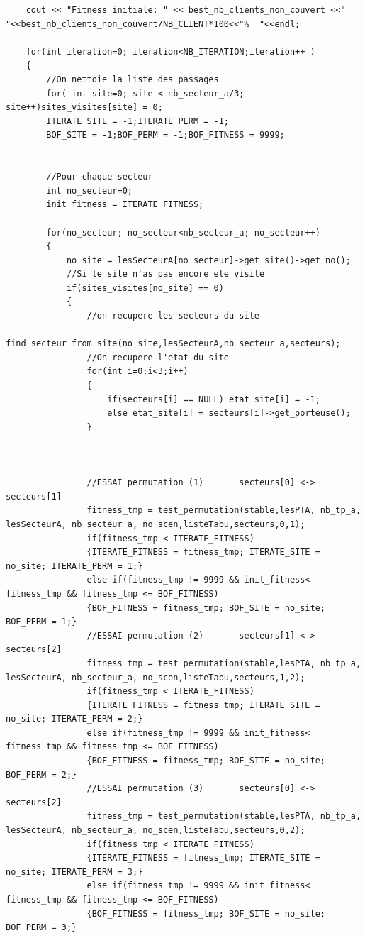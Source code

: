 \documentclass[a4paper, 11pt]{report}
\begin{document}
\begin{lstlisting}
    cout << "Fitness initiale: " << best_nb_clients_non_couvert <<"   "<<best_nb_clients_non_couvert/NB_CLIENT*100<<"%  "<<endl;

    for(int iteration=0; iteration<NB_ITERATION;iteration++ )
    {
        //On nettoie la liste des passages
        for( int site=0; site < nb_secteur_a/3; site++)sites_visites[site] = 0;
        ITERATE_SITE = -1;ITERATE_PERM = -1;
        BOF_SITE = -1;BOF_PERM = -1;BOF_FITNESS = 9999;


        //Pour chaque secteur
        int no_secteur=0;
        init_fitness = ITERATE_FITNESS;

        for(no_secteur; no_secteur<nb_secteur_a; no_secteur++)
        {
            no_site = lesSecteurA[no_secteur]->get_site()->get_no();
            //Si le site n'as pas encore ete visite
            if(sites_visites[no_site] == 0)
            {
                //on recupere les secteurs du site
                find_secteur_from_site(no_site,lesSecteurA,nb_secteur_a,secteurs);
                //On recupere l'etat du site
                for(int i=0;i<3;i++)
                {
                    if(secteurs[i] == NULL) etat_site[i] = -1;
                    else etat_site[i] = secteurs[i]->get_porteuse();
                }



                //ESSAI permutation (1)       secteurs[0] <-> secteurs[1]
                fitness_tmp = test_permutation(stable,lesPTA, nb_tp_a, lesSecteurA, nb_secteur_a, no_scen,listeTabu,secteurs,0,1);
                if(fitness_tmp < ITERATE_FITNESS)
                {ITERATE_FITNESS = fitness_tmp; ITERATE_SITE = no_site; ITERATE_PERM = 1;}
                else if(fitness_tmp != 9999 && init_fitness< fitness_tmp && fitness_tmp <= BOF_FITNESS)
                {BOF_FITNESS = fitness_tmp; BOF_SITE = no_site; BOF_PERM = 1;}
                //ESSAI permutation (2)       secteurs[1] <-> secteurs[2]
                fitness_tmp = test_permutation(stable,lesPTA, nb_tp_a, lesSecteurA, nb_secteur_a, no_scen,listeTabu,secteurs,1,2);
                if(fitness_tmp < ITERATE_FITNESS)
                {ITERATE_FITNESS = fitness_tmp; ITERATE_SITE = no_site; ITERATE_PERM = 2;}
                else if(fitness_tmp != 9999 && init_fitness< fitness_tmp && fitness_tmp <= BOF_FITNESS)
                {BOF_FITNESS = fitness_tmp; BOF_SITE = no_site; BOF_PERM = 2;}
                //ESSAI permutation (3)       secteurs[0] <-> secteurs[2]
                fitness_tmp = test_permutation(stable,lesPTA, nb_tp_a, lesSecteurA, nb_secteur_a, no_scen,listeTabu,secteurs,0,2);
                if(fitness_tmp < ITERATE_FITNESS)
                {ITERATE_FITNESS = fitness_tmp; ITERATE_SITE = no_site; ITERATE_PERM = 3;}
                else if(fitness_tmp != 9999 && init_fitness< fitness_tmp && fitness_tmp <= BOF_FITNESS)
                {BOF_FITNESS = fitness_tmp; BOF_SITE = no_site; BOF_PERM = 3;}



\end{lstlisting}
\end{document}
